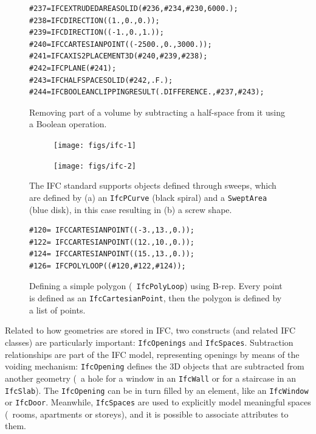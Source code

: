 \begin{figure}
\begin{lstlisting}[frame=single]
#237=IFCEXTRUDEDAREASOLID(#236,#234,#230,6000.);
#238=IFCDIRECTION((1.,0.,0.));
#239=IFCDIRECTION((-1.,0.,1.));
#240=IFCCARTESIANPOINT((-2500.,0.,3000.));
#241=IFCAXIS2PLACEMENT3D(#240,#239,#238);
#242=IFCPLANE(#241);
#243=IFCHALFSPACESOLID(#242,.F.);
#244=IFCBOOLEANCLIPPINGRESULT(.DIFFERENCE.,#237,#243);
\end{lstlisting}
\caption{Removing part of a volume by subtracting a half-space from it using a Boolean operation.}%
\label{fig:csg}
\end{figure}

\begin{figure}
\centering
\begin{subfigure}[b]{0.45\linewidth}
	\texttt{[image: figs/ifc-1]}%
	\label{subfig:ifc-1}
\end{subfigure}
\begin{subfigure}[b]{0.45\linewidth}
	\texttt{[image: figs/ifc-2]}%
	\label{subfig:ifc-2}
\end{subfigure}
\caption{The IFC standard supports objects defined through sweeps, which are defined by (a) an \texttt{IfcPCurve} (black spiral) and a \texttt{SweptArea} (blue disk), in this case resulting in (b) a screw shape.}%
\label{fig:sweeps}
\end{figure}

\begin{figure}
\begin{lstlisting}[frame=single]
#120= IFCCARTESIANPOINT((-3.,13.,0.));
#122= IFCCARTESIANPOINT((12.,10.,0.));
#124= IFCCARTESIANPOINT((15.,13.,0.));
#126= IFCPOLYLOOP((#120,#122,#124));
\end{lstlisting}
\caption{Defining a simple polygon (\ie\ \texttt{IfcPolyLoop}) using B-rep.
Every point is defined as an \texttt{IfcCartesianPoint}, then the polygon is defined by a list of points.}%
\label{fig:brep}
\end{figure}

Related to how geometries are stored in IFC, two constructs (and related IFC classes) are particularly important: \texttt{IfcOpenings} and \texttt{IfcSpaces}.
Subtraction relationships are part of the IFC model, representing openings by means of the voiding mechanism:
\texttt{IfcOpening} defines the 3D objects that are subtracted from another geometry (\eg\ a hole for a window in an \texttt{IfcWall} or for a staircase in an \texttt{IfcSlab}).
The \texttt{IfcOpening} can be in turn filled by an element, like an \texttt{IfcWindow} or \texttt{IfcDoor}.
Meanwhile, \texttt{IfcSpaces} are used to explicitly model meaningful spaces (\eg\ rooms, apartments or storeys), and it is possible to associate attributes to them.

